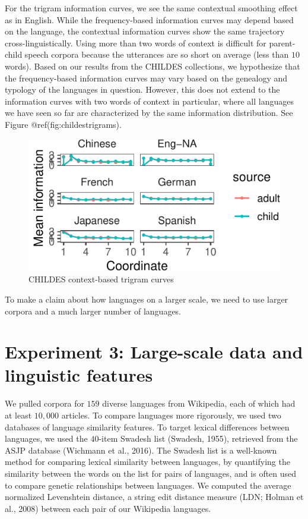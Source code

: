 \documentclass[10pt, letterpaper]{article}
\newenvironment{CodeChunk}{}{}
\begin{document}
For the trigram information curves, we see the same contextual smoothing
effect as in English. While the frequency-based information curves may
depend based on the language, the contextual information curves show the
same trajectory cross-linguistically. Using more than two words of
context is difficult for parent-child speech corpora because the
utterances are so short on average (less than \(10\) words). Based on
our results from the CHILDES collections, we hypothesize that the
frequency-based information curves may vary based on the genealogy and
typology of the languages in question. However, this does not extend to
the information curves with two words of context in particular, where
all languages we have seen so far are characterized by the same
information distribution. See Figure @ref(fig:childestrigrams).

\begin{CodeChunk}
\begin{figure}[tb]
\includegraphics{figs/childestrigrams-1} \caption[CHILDES context-based trigram curves]{CHILDES context-based trigram curves}\label{fig:childestrigrams}
\end{figure}
\end{CodeChunk}

To make a claim about how languages on a larger scale, we need to use
larger corpora and a much larger number of languages.

\hypertarget{experiment-3-large-scale-data-and-linguistic-features}{%
\section{Experiment 3: Large-scale data and linguistic
features}\label{experiment-3-large-scale-data-and-linguistic-features}}

We pulled corpora for \(159\) diverse languages from Wikipedia, each of
which had at least \(10,000\) articles. To compare languages more
rigorously, we used two databases of language similarity features. To
target lexical differences between languages, we used the \(40\)-item
Swadesh list (Swadesh, 1955), retrieved from the ASJP database (Wichmann
et al., 2016). The Swadesh list is a well-known method for comparing
lexical similarity between languages, by quantifying the similarity
between the words on the list for pairs of languages, and is often used
to compare genetic relationships between languages. We computed the
average normalized Levenshtein distance, a string edit distance measure
(LDN; Holman et al., 2008) between each pair of our Wikipedia languages.
\end{document}
